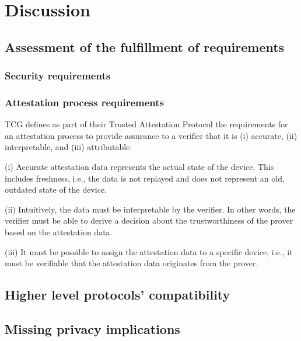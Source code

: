 
\chapter{Discussion}\label{chapter:discussion}

\section{Assessment of the fulfillment of requirements}

\subsection{Security requirements}

\subsection{Attestation process requirements}


\ac{TCG} defines as part of their Trusted Attestation Protocol \cite{tap} the requirements for an attestation process to provide assurance to a verifier that it is (i) accurate, (ii) interpretable, and (iii) attributable.

(i) Accurate attestation data represents the actual state of the device.
This includes freshness, i.e., the data is not replayed and does not represent an old, outdated state of the device.

(ii) Intuitively, the data must be interpretable by the verifier.
In other words, the verifier must be able to derive a decision about the trustworthiness of the prover based on the attestation data.

(iii) It must be possible to assign the attestation data to a specific device, i.e., it must be verifiable that the attestation data originates from the prover.


\section{Higher level protocols' compatibility}

\section{Missing privacy implications}

